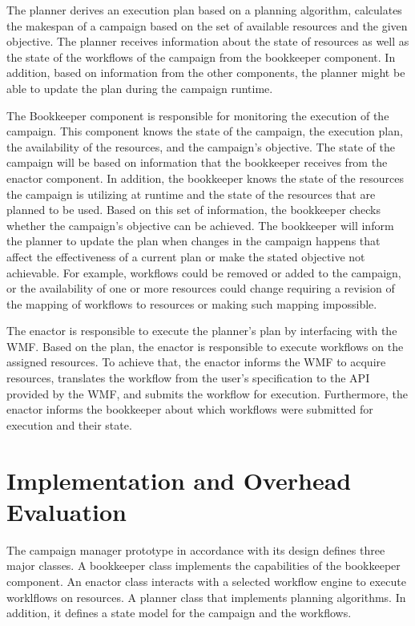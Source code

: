 The planner derives an execution plan based on a planning algorithm, calculates the makespan of a campaign based on the set of available resources and the given objective. 
The planner receives information about the state of resources as well as the state of the workflows of the campaign from the bookkeeper component.
In addition, based on information from the other components, the planner might be able to update the plan during the campaign runtime. 

The Bookkeeper component is responsible for monitoring the execution of the campaign.
This component knows the state of the campaign, the execution plan, the availability of the resources, and the campaign's objective.
The state of the campaign will be based on information that the bookkeeper receives from the enactor component.
In addition, the bookkeeper knows the state of the resources the campaign is utilizing at runtime and the state of the resources that are planned to be used.
Based on this set of information, the bookkeeper checks whether the campaign's objective can be achieved.
The bookkeeper will inform the planner to update the plan when changes in the campaign happens that affect the effectiveness of a current plan or make the stated objective not achievable. 
For example, workflows could be removed or added to the campaign, or the availability of one or more resources could change requiring a revision of the mapping of workflows to resources or making such mapping impossible.

The enactor is responsible to execute the planner's plan by interfacing with the WMF.
Based on the plan, the enactor is responsible to execute workflows on the assigned resources.
To achieve that, the enactor informs the WMF to acquire resources, translates the workflow from the user's specification to the API provided by the WMF, and submits the workflow for execution.
Furthermore, the enactor informs the bookkeeper about which workflows were submitted for execution and their state.

\section{Implementation and Overhead Evaluation}
\label{sec:cm_impl}

The campaign manager prototype in accordance with its design defines three major classes.
A bookkeeper class implements the capabilities of the bookkeeper component.
An enactor class interacts with a selected workflow engine to execute worklflows on resources.
A planner class that implements planning algorithms.
In addition, it defines a state model for the campaign and the workflows.

